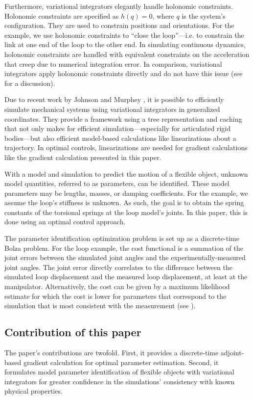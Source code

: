 \documentclass[letterpaper, 10pt, conference]{ieeeconf}
\begin{document}
Furthermore, variational integrators elegantly handle holonomic constraints.  Holonomic constraints are specified as $h(q) = 0$, where $q$ is the system's configuration.  They are used to constrain positions and orientations.  For the example, we use holonomic constraints to ``close the loop''---i.e. to constrain the link at one end of the loop to the other end.  In simulating continuous dynamics, holonomic constraints are handled with equivalent constraints on the acceleration that creep due to numerical integration error.  In comparison, variational integrators apply holonomic constraints directly and do not have this issue (see \cite{johnson_murphey_scalable} for a discussion).

Due to recent work by Johnson and Murphey \cite{johnson_murphey_scalable, johnson_murphey_linearization}, it is possible to efficiently simulate mechanical systems using variational integrators in generalized coordinates. They provide a framework using a tree representation and caching that not only makes for efficient simulation---especially for articulated rigid bodies---but also efficient model-based calculations like linearizations about a trajectory.   In optimal controls, linearizations are needed for gradient calculations like the gradient calculation presented in this paper. 

With a model and simulation to predict the motion of a flexible object, unknown model quantities, referred to as parameters, can be identified.  These model parameters may be lengths, masses, or damping coefficients.  For the example, we assume the loop's stiffness is unknown.  As such, the goal is to obtain the spring constants of the torsional springs at the loop model's joints.  In this paper, this is done using an optimal control approach.

The parameter identification optimization problem is set up as a discrete-time Bolza problem.  For the loop example, the cost functional is a summation of the joint errors between the simulated joint angles and the experimentally-measured joint angles.  The joint error directly correlates to the difference between the simulated loop displacement and the measured loop displacement, at least at the manipulator.  Alternatively, the cost can be given by a maximum likelihood estimate for which the cost is lower for parameters that correspond to the simulation that is most consistent with the measurement (see \cite{houska_etal}).  

\subsection{Contribution of this paper}
The paper's contributions are twofold.  First, it provides a discrete-time adjoint-based gradient calculation for optimal parameter estimation.  Second, it formulates model parameter identification of flexible objects with variational integrators for greater confidence in the simulations' consistency with known physical properties.
\end{document}
